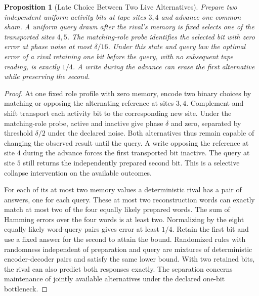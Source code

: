 \documentclass[11pt,a4paper]{article}
\newtheorem{proposition}[theorem]{Proposition}
\theoremstyle{definition}
\begin{document}
\begin{proposition}[Late Choice Between Two Live Alternatives]\label{prop:bridge-tower-ambiguity}
Prepare two independent uniform activity bits at tape sites $3,4$ and advance one common sham. A uniform query drawn after the rival's memory is fixed selects one of the transported sites $4,5$. The matching-role probe identifies the selected bit with zero error at phase noise at most $\delta/16$. Under this state and query law the optimal error of a rival retaining one bit before the query, with no subsequent tape reading, is exactly $1/4$. A write during the advance can erase the first alternative while preserving the second.
\end{proposition}
\begin{proof}
At one fixed role profile with zero memory, encode two binary choices by matching or opposing the alternating reference at sites $3,4$. Complement and shift transport each activity bit to the corresponding new site. Under the matching-role probe, active and inactive give phase $\delta$ and zero, separated by threshold $\delta/2$ under the declared noise. Both alternatives thus remain capable of changing the observed result until the query. A write opposing the reference at site $4$ during the advance forces the first transported bit inactive. The query at site $5$ still returns the independently prepared second bit. This is a selective collapse intervention on the available outcomes.

For each of its at most two memory values a deterministic rival has a pair of answers, one for each query. These at most two reconstruction words can exactly match at most two of the four equally likely prepared words. The sum of Hamming errors over the four words is at least two. Normalizing by the eight equally likely word-query pairs gives error at least $1/4$. Retain the first bit and use a fixed answer for the second to attain the bound. Randomized rules with randomness independent of preparation and query are mixtures of deterministic encoder-decoder pairs and satisfy the same lower bound. With two retained bits, the rival can also predict both responses exactly. The separation concerns maintenance of jointly available alternatives under the declared one-bit bottleneck.
\end{proof}
\end{document}
